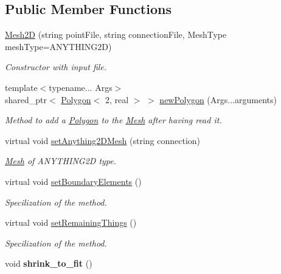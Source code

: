 \subsection*{\-Public \-Member \-Functions}
\begin{DoxyCompactItemize}
\item 
\hypertarget{class_mesh2_d_a98d286dea8fdf7b908b3a56991beca47}{\hyperlink{class_mesh2_d_a98d286dea8fdf7b908b3a56991beca47}{\-Mesh2\-D} (string point\-File, string connection\-File, \-Mesh\-Type mesh\-Type=\-A\-N\-Y\-T\-H\-I\-N\-G2\-D)}\label{class_mesh2_d_a98d286dea8fdf7b908b3a56991beca47}

\begin{DoxyCompactList}\small\item\em \-Constructor with input file. \end{DoxyCompactList}\item 
\hypertarget{class_mesh2_d_a08651a8b7f996ea4d8896bd0802d6f24}{{\footnotesize template$<$typename... \-Args$>$ }\\shared\-\_\-ptr$<$ \hyperlink{class_polygon}{\-Polygon}$<$ 2, real $>$ $>$ \hyperlink{class_mesh2_d_a08651a8b7f996ea4d8896bd0802d6f24}{new\-Polygon} (\-Args...\-arguments)}\label{class_mesh2_d_a08651a8b7f996ea4d8896bd0802d6f24}

\begin{DoxyCompactList}\small\item\em \-Method to add a \hyperlink{class_polygon}{\-Polygon} to the \hyperlink{class_mesh}{\-Mesh} after having read it. \end{DoxyCompactList}\item 
virtual void \hyperlink{class_mesh2_d_a6cf7a73abadd08ecd18d6f35c7b644c3}{set\-Anything2\-D\-Mesh} (string connection)
\begin{DoxyCompactList}\small\item\em \hyperlink{class_mesh}{\-Mesh} of \-A\-N\-Y\-T\-H\-I\-N\-G2\-D type. \end{DoxyCompactList}\item 
virtual void \hyperlink{class_mesh2_d_ac6408b5999b1deddbbd137dc8bd9e1cd}{set\-Boundary\-Elements} ()
\begin{DoxyCompactList}\small\item\em \-Specilization of the method. \end{DoxyCompactList}\item 
virtual void \hyperlink{class_mesh2_d_ae52c22a91d85fdb99955bf57162f6dac}{set\-Remaining\-Things} ()
\begin{DoxyCompactList}\small\item\em \-Specilization of the method. \end{DoxyCompactList}\item 
\hypertarget{class_mesh2_d_a06fba3c3fc41d127a8238d4a1b7972a3}{void {\bfseries shrink\-\_\-to\-\_\-fit} ()}\label{class_mesh2_d_a06fba3c3fc41d127a8238d4a1b7972a3}

\end{DoxyCompactItemize}
